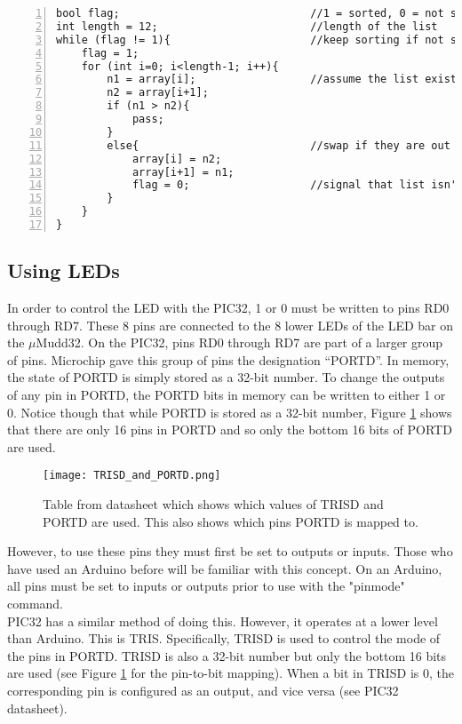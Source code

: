 \documentclass[11pt]{article}
\begin{document}
\begin{lstlisting}[numbers=left,basicstyle=\footnotesize]
bool flag;                              //1 = sorted, 0 = not sorted
int length = 12;                        //length of the list
while (flag != 1){                      //keep sorting if not sorted
    flag = 1;                           
    for (int i=0; i<length-1; i++){     
        n1 = array[i];                  //assume the list exists somewhere
        n2 = array[i+1];
        if (n1 > n2){
            pass;
        }
        else{                           //swap if they are out of order
            array[i] = n2;              
            array[i+1] = n1;
            flag = 0;                   //signal that list isn't sorted
        }
    }
}
\end{lstlisting}


\subsection{Using LEDs}

In order to control the LED with the PIC32, 1 or 0 must be written to pins RD0 through RD7. These 8 pins are connected to the 8 lower LEDs of the LED bar on the $\mu$Mudd32. On the PIC32, pins RD0 through RD7 are part of a larger group of pins. Microchip gave this group of pins the designation \enquote{PORTD}. In memory, the state of PORTD is simply stored as a 32-bit number. To change the outputs of any pin in PORTD, the PORTD bits in memory can be written to either 1 or 0. Notice though that while PORTD is stored as a 32-bit number, Figure \ref{fig:TRISD} shows that there are only 16 pins in PORTD and so only the bottom 16 bits of PORTD are used. \\

\begin{figure}[h!]
\centering
\texttt{[image: TRISD\_and\_PORTD.png]}
\caption{Table from datasheet which shows which values of TRISD and PORTD are used. This also shows which pins PORTD is mapped to.}
\label{fig:TRISD}
\end{figure} 

However, to use these pins they must first be set to outputs or inputs. Those who have used an Arduino before will be familiar with this concept. On an Arduino, all pins must be set to inputs or outputs prior to use with the "pinmode" command. \\

PIC32 has a similar method of doing this. However, it operates at a lower level than Arduino. This is TRIS. Specifically, TRISD is used to control the mode of the pins in PORTD. TRISD is also a 32-bit number but only the bottom 16 bits are used (see Figure \ref{fig:TRISD} for the pin-to-bit mapping). When a bit in TRISD is 0, the corresponding pin is configured as an output, and vice versa (see PIC32 datasheet). 
 
\end{document}
